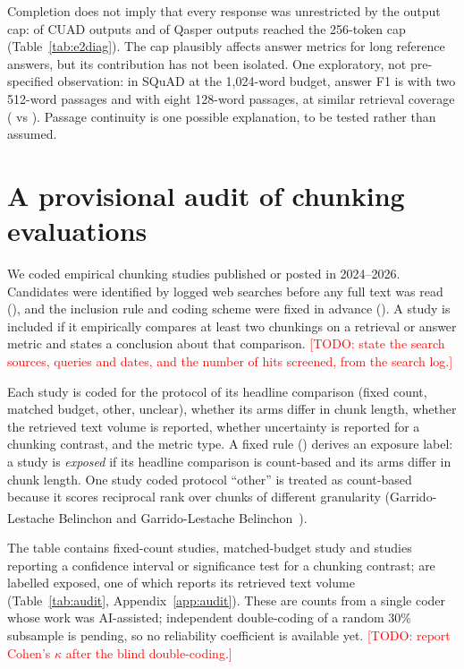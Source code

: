 \documentclass[11pt]{article}
\newcommand{\citeL}[1]{\cite{#1}\textsuperscript{\textcolor{red}{\dag}}}
\newcommand{\todo}[1]{\textcolor{red}{[TODO: #1]}}
\begin{document}
Completion does not imply that every response was unrestricted by the output cap: \EtwoTruncCuad{} of
\EtwoJobsCuad{} CUAD outputs and \EtwoTruncQasper{} of \EtwoJobsQasper{} Qasper outputs reached the 256-token cap
(Table~\ref{tab:e2diag}). The cap plausibly affects answer metrics for long reference answers, but its contribution has
not been isolated. One exploratory, not pre-specified observation: in SQuAD at the 1,024-word budget, answer F1 is
\EtwoSquadFiveTwelveBudgetFone{} with two 512-word passages and \EtwoSquadOneTwoEightBudgetFone{} with eight 128-word
passages, at similar retrieval coverage (\EtwoSquadFiveTwelveBudgetCov{} vs \EtwoSquadOneTwoEightBudgetCov). Passage
continuity is one possible explanation, to be tested rather than assumed.

\section{A provisional audit of chunking evaluations}\label{sec:audit}
We coded \AuditN{} empirical chunking studies published or posted in 2024--2026. Candidates were identified by logged
web searches before any full text was read (), and the inclusion rule
and coding scheme were fixed in advance (). A study is included if it
empirically compares at least two chunkings on a retrieval or answer metric and states a conclusion about that
comparison. \todo{state the search sources, queries and dates, and the number of hits screened, from the search log.}

Each study is coded for the protocol of its headline comparison (fixed count, matched budget, other, unclear), whether
its arms differ in chunk length, whether the retrieved text volume is reported, whether uncertainty is reported for a
chunking contrast, and the metric type. A fixed rule () derives an exposure label: a study is
\emph{exposed} if its headline comparison is count-based and its arms differ in chunk length. One study coded
protocol ``other'' is treated as count-based because it scores reciprocal rank over chunks of different granularity
(Garrido-Lestache Belinchon and Garrido-Lestache Belinchon~\citeL{garrido2026chunksize}).

The table contains \AuditFixedK{} fixed-count studies, \AuditBudget{} matched-budget study and \AuditUncertainty{}
studies reporting a confidence interval or significance test for a chunking contrast; \AuditExposed{} are labelled
exposed, one of which reports its retrieved text volume (Table~\ref{tab:audit}, Appendix~\ref{app:audit}). These are
counts from a single coder whose work was AI-assisted; independent double-coding of a random 30\% subsample is
pending, so no reliability coefficient is available yet. \todo{report Cohen's $\kappa$ after the blind double-coding.}
\end{document}
